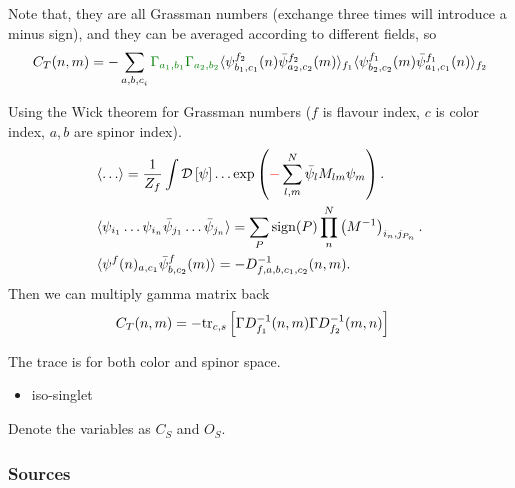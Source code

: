 Note that, they are all Grassman numbers (exchange three times will introduce a minus sign), and they can be averaged according to different fields, so
\begin{equation}
\begin{split}
&C_T(n,m)=-\sum _{{a,b,c}_i}\textcolor[rgb]{0,0.5,0}{\Gamma _{a_1,b_1}}\textcolor[rgb]{0,0.5,0}{\Gamma _{a_2,b_2}}\langle \psi ^{f_2} _{b_1,c_1} (n)\bar{\psi} ^{f_2} _{a_2,c_2}(m)\rangle _{f_1}\langle \psi ^{f_1}_{b_2,c_2}(m)\bar{\psi} ^{f_1} _{a_1,c_1} (n)\rangle _{f_2}\\
\end{split}
\end{equation}

Using the Wick theorem for Grassman numbers ($f$ is flavour index, $c$ is color index, $a,b$ are spinor index).
\begin{equation}
\begin{split}
&\langle \ldots \rangle = \frac{1}{Z_f}\int \mathcal{D}\left[\psi\right]\ldots \exp \left(\textcolor[rgb]{1,0,0}{-}\sum _{l,m}^N\bar{\psi}_lM_{lm}\psi_m\right).\\
&\langle \psi _{i_1}\ldots \psi _{i_n} \bar{\psi}_{j_1}\ldots \bar{\psi}_{j_n}\rangle = \sum _{P}{\rm sign}(P)\prod ^N_n \left(M^{-1}\right)_{i_n,j_{P_n}}.\\
&\langle \psi^f (n)_{a,c_1}\bar{\psi}^f_{b,c_2}(m)\rangle = -D_{f,a,b,c_1,c_2}^{-1}(n,m).\\
\end{split}
\end{equation}
Then we can multiply gamma matrix back
\begin{equation}
\begin{split}
&C_T(n,m)=-{\rm tr}_{c,s} \left[\Gamma D^{-1}_{f_1}(n,m)\Gamma D^{-1}_{f_2}(m,n)\right]
\end{split}
\end{equation}

The trace is for both color and spinor space.

\begin{itemize}
  \item iso-singlet
\end{itemize}

Denote the variables as $C_S$ and $O_S$.

\subsubsection{\label{Source}Sources}

